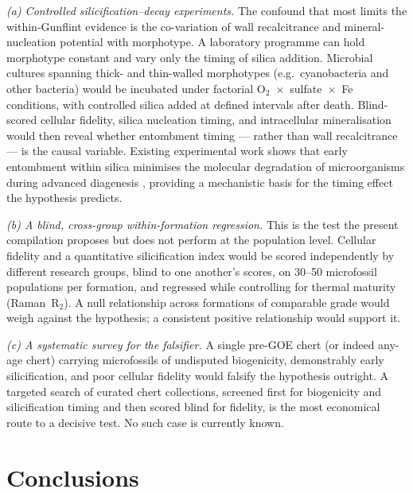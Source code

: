 \documentclass[11pt]{article}
\begin{document}
\textit{(a) Controlled silicification--decay experiments.} The confound that most limits the
within-Gunflint evidence is the co-variation of wall recalcitrance and mineral-nucleation potential
with morphotype. A laboratory programme can hold morphotype constant and vary only the timing of
silica addition. Microbial cultures spanning thick- and thin-walled morphotypes (e.g.\ cyanobacteria
and other bacteria) would be incubated under factorial O$_2$~$\times$~sulfate~$\times$~Fe conditions,
with controlled silica added at defined intervals after death. Blind-scored cellular fidelity, silica
nucleation timing, and intracellular mineralisation would then reveal whether entombment timing ---
rather than wall recalcitrance --- is the causal variable. Existing experimental work shows that
early entombment within silica minimises the molecular degradation of microorganisms during advanced
diagenesis \citep{Alleon2016silica}, providing a mechanistic basis for the timing effect the
hypothesis predicts.

\textit{(b) A blind, cross-group within-formation regression.} This is the test the present
compilation proposes but does not perform at the population level. Cellular fidelity and a
quantitative silicification index would be scored independently by different research groups, blind
to one another's scores, on 30--50 microfossil populations per formation, and regressed while
controlling for thermal maturity (Raman~R$_2$). A null relationship across formations of comparable
grade would weigh against the hypothesis; a consistent positive relationship would support it.

\textit{(c) A systematic survey for the falsifier.} A single pre-GOE chert (or indeed any-age chert)
carrying microfossils of undisputed biogenicity, demonstrably early silicification, and poor cellular
fidelity would falsify the hypothesis outright. A targeted search of curated chert collections,
screened first for biogenicity and silicification timing and then scored blind for fidelity, is the
most economical route to a decisive test. No such case is currently known.

\section{Conclusions}
\end{document}
